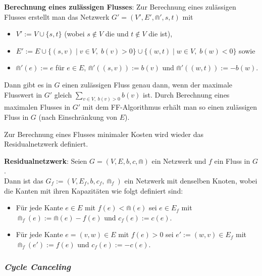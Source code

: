 \linie

\textbf{Berechnung eines zulässigen Flusses}:
Zur Berechnung eines zulässigen Flusses erstellt man das Netzwerk $G' = (V', E', \Cap', s, t)$
mit
\begin{itemize}
    \item
    $V' := V \cup \{s, t\}$
    (wobei $s \notin V$ die  und $t \notin V$ die  ist),
    
    \item
    $E' := E \cup \{(s, v) \;|\; v \in V,\; b(v) > 0\} \cup \{(w, t) \;|\; w \in V,\; b(w) < 0\}$
    sowie
    
    \item
    $\Cap'(e) := e$ für $e \in E$, $\Cap'((s, v)) := b(v)$ und $\Cap'((w, t)) := -b(w)$.
\end{itemize}
Dann gibt es in $G$ einen zulässigen Fluss genau dann, wenn der maximale Flusswert in $G'$
gleich $\sum_{v \in V,\; b(v) > 0} b(v)$ ist.
Durch Berechnung eines maximalen Flusses in $G'$ mit dem FF-Algorithmus erhält man so einen
zulässigen Fluss in $G$ (nach Einschränkung von $E$).

\linie

Zur Berechnung eines Flusses minimaler Kosten wird wieder das Residualnetzwerk definiert.

\textbf{Residualnetzwerk}:
Seien $G = (V, E, b, c, \Cap)$ ein Netzwerk und $f$ ein Fluss in $G$.\\
Dann ist das  $G_f := (V, E_f, b, c_f, \Cap_f)$ ein Netzwerk
mit denselben Knoten, wobei die Kanten mit ihren Kapazitäten wie folgt definiert sind:
\begin{itemize}
    \item
    Für jede Kante $e \in E$ mit $f(e) < \Cap(e)$ sei $e \in E_f$ mit\\
    $\Cap_f(e) := \Cap(e) - f(e)$ und $c_f(e) := c(e)$.
    
    \item
    Für jede Kante $e = (v, w) \in E$ mit $f(e) > 0$ sei $e' := (w, v) \in E_f$ mit\\
    $\Cap_f(e') := f(e)$ und $c_f(e) := -c(e)$.
\end{itemize}

\pagebreak

\subsubsection{%
    \emph{Cycle Canceling}%
}

